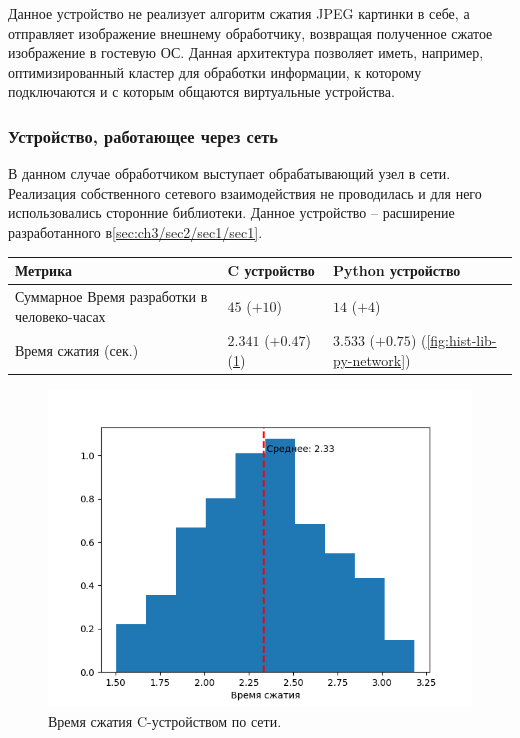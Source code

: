 Данное устройство не реализует алгоритм сжатия JPEG картинки в себе,
а отправляет изображение внешнему обработчику,
возвращая полученное сжатое изображение в гостевую ОС.
Данная архитектура позволяет иметь, например, оптимизированный
кластер для обработки информации, к которому подключаются и с
которым общаются виртуальные устройства.

\subsubsection{Устройство, работающее через сеть}\label{sec:ch3/sec2/sec2/sec1}

В данном случае обработчиком выступает обрабатывающий узел в сети.
Реализация собственного сетевого взаимодействия не проводилась
и для него использовались сторонние библиотеки.
Данное устройство -- расширение разработанного в\cref{sec:ch3/sec2/sec1/sec1}.

\begin{longtable}{| p{5cm} | p{5cm} | p{5cm} |}
    \hline
        Метрика &
        C устройство &
        Python устройство \\
    \hline
        Суммарное Время разработки в человеко-часах &
        $45$ ($+10$) &
        $14$ ($+4$) \\
    \hline
        Время сжатия (сек.)&
        $2.341$ ($+0.47$) (\cref{fig:hist-lib-c-network}) &
        $3.533$ ($+0.75$) (\cref{fig:hist-lib-py-network}) \\
    \hline
\end{longtable}


\begin{figure}[!htbp]
    \centering
    \begin{adjustbox}{max totalsize={0.8\textwidth}{\textheight}}
        \includegraphics{images/hist-lib-c-network.png}
    \end{adjustbox}
    \caption{Время сжатия C-устройством по сети.}\label{fig:hist-lib-c-network}
\end{figure}


